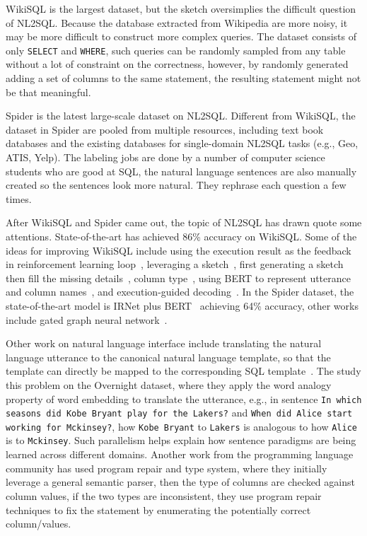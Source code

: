 WikiSQL is the largest dataset, but the sketch oversimplies the difficult question of NL2SQL. Because the database extracted from Wikipedia are more noisy, it may be more difficult to construct more complex queries. The dataset consists of only \texttt{SELECT} and \texttt{WHERE}, such queries can be randomly sampled from any table without a lot of constraint on the correctness, however, by randomly generated adding a set of columns to the same statement, the resulting statement might not be that meaningful. 

Spider is the latest large-scale dataset on NL2SQL. Different from WikiSQL, the dataset in Spider are pooled from multiple resources, including text book databases and the existing databases for single-domain NL2SQL tasks (e.g., Geo, ATIS, Yelp). The labeling jobs are done by a number of computer science students who are good at SQL, the natural language sentences are also manually created so the sentences look more natural. They rephrase each question a few times. 

After WikiSQL and Spider came out, the topic of NL2SQL has drawn quote some attentions. State-of-the-art has achieved 86\% accuracy on WikiSQL. Some of the ideas for improving WikiSQL include using the execution result as the feedback in reinforcement learning loop~\cite{zhong2017seq2sql}, leveraging a sketch~\cite{xu2017sqlnet}, first generating a sketch then fill the missing details~\cite{dong2018coarse}, column type~\cite{yu2018typesql}, using BERT to represent utterance and column names~\cite{hwang2019achieving}, and execution-guided decoding~\cite{wang2018execution}. In the Spider dataset, the state-of-the-art model is IRNet plus BERT~\cite{guo2019towards} achieving 64\% accuracy, other works include gated graph neural network~\cite{bogin2019representing}. 

Other work on natural language interface include translating the natural language utterance to the canonical natural language template, so that the template can directly be mapped to the corresponding SQL template~\cite{su2017cross}. The study this problem on the Overnight dataset, where they apply the word analogy property of word embedding to translate the utterance, e.g., in sentence \texttt{In which seasons did Kobe Bryant play for the Lakers?} and \texttt{When did Alice start working for Mckinsey?}, how \texttt{Kobe Bryant} to \texttt{Lakers} is analogous to how \texttt{Alice} is to \texttt{Mckinsey}. Such parallelism helps explain how sentence paradigms are being learned across different domains. Another work from the programming language community \cite{yaghmazadeh2017sqlizer} has used program repair and type system, where they initially leverage a general semantic parser, then the type of columns are checked against column values, if the two types are inconsistent, they use program repair techniques to fix the statement by enumerating the potentially correct column/values. 

